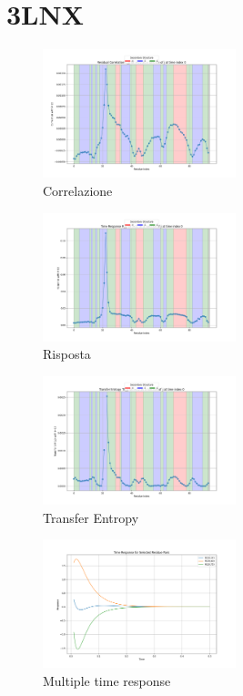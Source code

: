 \documentclass[Lau,binding=0.6cm,oneside,noexaminfo]{sapthesis}
\begin{document}
\section{3LNX}
\begin{figure}[H]
    \centering
    \includegraphics[width=0.5\textwidth]{"images/3LNXResidual Correlation C_ij for i=22 as a function of j at time index 0.png"}
    \caption{Correlazione}
\end{figure}
\begin{figure}[H]
    \centering
    \includegraphics[width=0.5\textwidth]{"images/3LNXTime Response R_ij for i=22 as a function of j at time index 0.png"}
    \caption{Risposta}
\end{figure}

\begin{figure}[H]
    \centering
    \includegraphics[width=0.5\textwidth]{"images/3LNXTransfer Entropy TE_ij for i=22 as a function of j at time index 0.png"}
    \caption{Transfer Entropy}
\end{figure}
\begin{figure}[H]
    \centering
    \includegraphics[width=0.5\textwidth]{"images/3LNXMultiple_time_resposne.png"}
    \caption{Multiple time response}
\end{figure}
\end{document}
